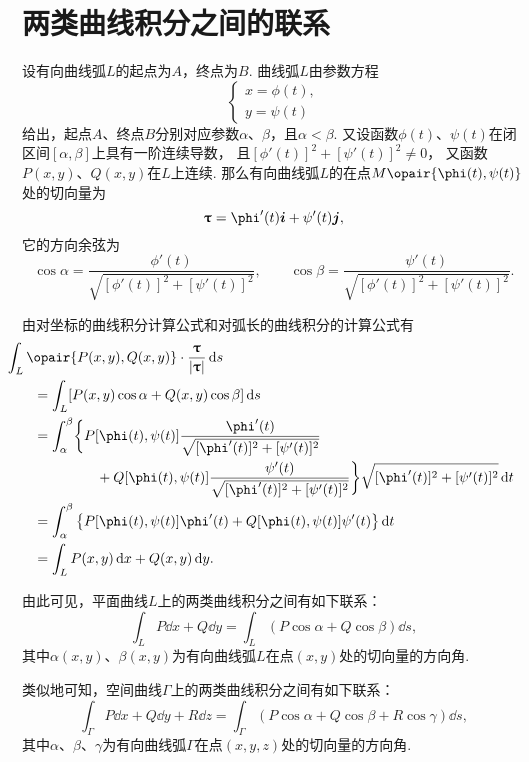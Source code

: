 \section{两类曲线积分之间的联系}
\begingroup
\def\lenTau{\sqrt{[\phi'(t)]^2+[\psi'(t)]^2}}
\def\fTau#1{\frac{#1}{\lenTau}}
\def\funcParam{[\phi(t),\psi(t)]}

设有向曲线弧\(L\)的起点为\(A\)，终点为\(B\).
曲线弧\(L\)由参数方程\[
	\begin{cases}
		x = \phi(t), \\
		y = \psi(t)
	\end{cases}
\]给出，起点\(A\)、终点\(B\)分别对应参数\(\alpha\)、\(\beta\)，且\(\alpha < \beta\).
又设函数\(\phi(t)\)、\(\psi(t)\)在闭区间\([\alpha,\beta]\)上具有一阶连续导数，
且\([\phi'(t)]^2+[\psi'(t)]^2 \neq 0\)，
又函数\(P(x,y)\)、\(Q(x,y)\)在\(L\)上连续.
那么有向曲线弧\(L\)的在点\(M\opair{\phi(t),\psi(t)}\)处的切向量为\[
	\vb{\tau} = \phi'(t) \vb{i} + \psi'(t) \vb{j},
\]
它的方向余弦为\[
	\cos\alpha=\fTau{\phi'(t)},
	\qquad
	\cos\beta=\fTau{\psi'(t)}.
\]

由对坐标的曲线积分计算公式和对弧长的曲线积分的计算公式有
\begin{align*}
	&\hspace{-20pt}
	\int_L \opair{P(x,y),Q(x,y)}\cdot\frac{\vb{\tau}}{\abs{\vb{\tau}}}\dd{s} \\
	&=\int_L [P(x,y)\cos\alpha+Q(x,y)\cos\beta]\dd{s} \\
	&=\int_\alpha^\beta \biggl\{ {P\funcParam\fTau{\phi'(t)}} \\
		&\hspace{45pt}+{Q\funcParam\fTau{\psi'(t)}} \biggr\} \lenTau \dd{t} \\
	&=\int_\alpha^\beta \left\{
			P\funcParam\phi'(t) + Q\funcParam\psi'(t)
		\right\} \dd{t} \\
	&=\int_L{P(x,y)\dd{x}+Q(x,y)\dd{y}}.
\end{align*}
\endgroup

由此可见，平面曲线\(L\)上的两类曲线积分之间有如下联系：
\begin{equation}\label{equation:线积分与面积分.平面曲线上两类曲线积分之间的联系}
	\int_L P\dd{x}+Q\dd{y}
	=\int_L (P\cos\alpha+Q\cos\beta)\dd{s},
\end{equation}
其中\(\alpha(x,y)\)、\(\beta(x,y)\)为有向曲线弧\(L\)在点\((x,y)\)处的切向量的方向角.

类似地可知，空间曲线\(\Gamma\)上的两类曲线积分之间有如下联系：
\begin{equation}\label{equation:线积分与面积分.空间曲线上两类曲线积分之间的联系}
	\int_\Gamma P\dd{x}+Q\dd{y}+R\dd{z}
	=\int_\Gamma (P\cos\alpha+Q\cos\beta+R\cos\gamma)\dd{s},
\end{equation}
其中\(\alpha\)、\(\beta\)、\(\gamma\)为有向曲线弧\(\Gamma\)在点\((x,y,z)\)处的切向量的方向角.


